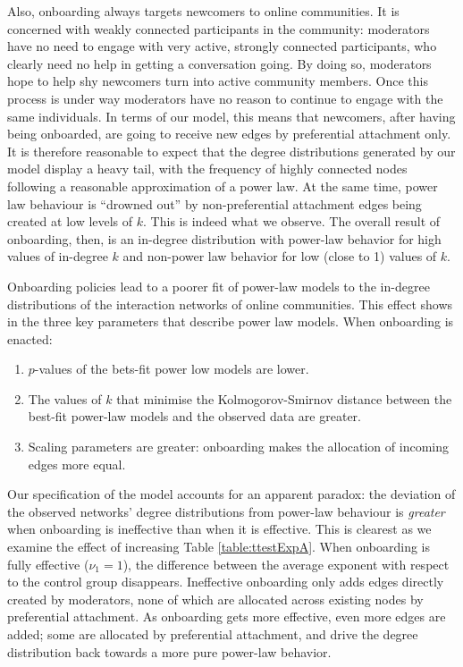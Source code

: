 \documentclass{article}
\begin{document}
Also, onboarding always targets newcomers to online communities. It is concerned with weakly connected participants in the community: moderators have no need to engage with very active, strongly connected participants, who clearly need no help in getting a conversation going. By doing so, moderators hope to help shy newcomers turn into active community members. Once this process is under way moderators have no reason to continue to engage with the same individuals. In terms of our model, this means that newcomers, after having being onboarded, are going to receive new edges by preferential attachment only. It is therefore reasonable to expect that the degree distributions generated by our model display a heavy tail, with the frequency of highly connected nodes following a reasonable approximation of a power law. At the same time, power law behaviour is ``drowned out'' by non-preferential attachment edges being created at low levels of $k$. This is indeed what we observe. The overall result of onboarding, then, is an in-degree distribution with power-law behavior for high values of in-degree $k$ and non-power law behavior for low (close to 1) values of $k$. 

Onboarding policies lead to a poorer fit of power-law models to the in-degree distributions of the interaction networks of online communities. This effect shows in the three key parameters that describe power law models. When onboarding is enacted:

\begin {enumerate}
\item $p$-values of the bets-fit power low models are lower. 
\item The values of $k$ that minimise the Kolmogorov-Smirnov distance between the best-fit power-law models and the observed data are greater. 
\item Scaling parameters are greater: onboarding makes the allocation of incoming edges more equal. 
\end{enumerate}

Our specification of the model accounts for an apparent paradox: the deviation of the observed networks' degree distributions from power-law behaviour is \emph{greater} when onboarding is ineffective than when it is effective. This is clearest as we examine the effect of increasing Table \ref{table:ttestExpA}. When onboarding is fully effective ($\nu_1 = 1$), the difference between the average exponent with respect to the control group disappears. Ineffective onboarding only adds edges directly created by moderators, none of which are allocated across existing nodes by preferential attachment. As onboarding gets more effective, even more edges are added; some are allocated by preferential attachment, and drive the degree distribution back towards a more pure power-law behavior. 
\end{document}
